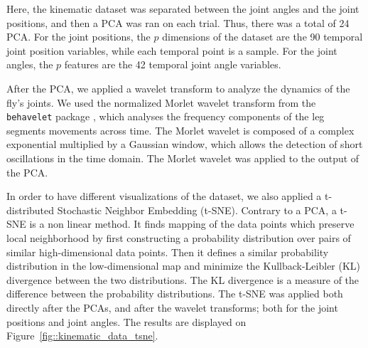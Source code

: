 \vspace{\baselineskip}

Here, the kinematic dataset was separated between the joint angles and the joint positions, and then a PCA was ran on each trial.
Thus, there was a total of 24 PCA.
For the joint positions, the $p$ dimensions of the dataset are the 90 temporal joint position variables, while each temporal point is a sample.
For the joint angles, the $p$ features are the 42 temporal joint angle variables.

\vspace{\baselineskip}

After the PCA, we applied a wavelet transform to analyze the dynamics of the fly's joints.
We used the normalized Morlet wavelet transform from the \verb*|behavelet| package \cite{berman2014}, which analyses the frequency components of the leg segments movements across time.
The Morlet wavelet is composed of a complex exponential multiplied by a Gaussian window, which allows the detection of short oscillations in the time domain.
The Morlet wavelet was applied to the output of the PCA.

\vspace{\baselineskip}

In order to have different visualizations of the dataset, we also applied a t-distributed Stochastic Neighbor Embedding (t-SNE).
Contrary to a PCA, a t-SNE is a non linear method.
It finds mapping of the data points which preserve local neighborhood by first constructing a probability distribution over pairs of similar high-dimensional data points.
Then it defines a similar probability distribution in the low-dimensional map and minimize the Kullback-Leibler (KL) divergence between the two distributions.
The KL divergence is a measure of the difference between the probability distributions.
The t-SNE was applied both directly after the PCAs, and after the wavelet transforms; both for the joint positions and joint angles.
The results are displayed on Figure~\ref{fig::kinematic_data_tsne}.

